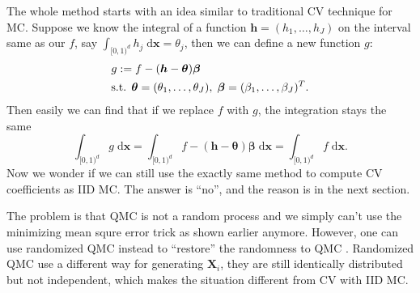 

The whole method starts with an idea similar to traditional CV technique for MC.
Suppose we know the integral of a function $\boldsymbol{h}=(h_1,\dots,h_J)$ on the interval same as our $f$, say $\int_{[0,1)^d}h_j\; \textrm{d}\mathbf{x}=\theta_j$, then we can define a new function $g$:
\begin{align}\label{eq:defg}
    & g:=f-(\boldsymbol{h}-\boldsymbol{\theta})\boldsymbol{\beta}\\
    \notag
    &\text{s.t. }\boldsymbol{\theta}=(\theta_1,\dots,\theta_J),
    \;\boldsymbol{\beta}=(\beta_1,\dots,\beta_J)^T.
\end{align}
Then easily we can find that if we replace $f$ with $g$, the integration stays the same
\[
    \int_{[0,1)^d}g\;\textrm{d}\mathbf{x}
        =\int_{[0,1)^d}f-(\boldsymbol{h}-\boldsymbol{\theta})\boldsymbol{\beta}\;\textrm{d}\mathbf{x}
            =\int_{[0,1)^d}f\;\textrm{d}\mathbf{x}.
\]
Now we wonder if we can still use the exactly same method to compute CV coefficients as IID MC. The answer is ``no'', and the reason is in the next section. 


The problem is that QMC is not a random process and we simply can't use the minimizing mean squre error trick as shown earlier anymore. However, one can use randomized QMC instead to ``restore'' the randomness to QMC \cite{owen2006warnock}. 
Randomized QMC use a different way for generating $\mathbf{X}_i$, they are still identically distributed but not independent, which makes the situation different from CV with IID MC.

